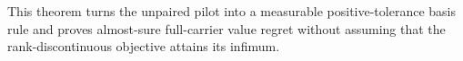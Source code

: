 This theorem turns the unpaired pilot into a measurable positive-tolerance basis rule and proves almost-sure full-carrier value regret without assuming that the rank-discontinuous objective attains its infimum.